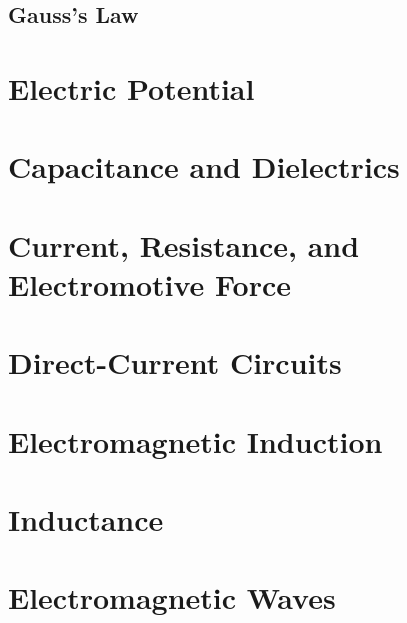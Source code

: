 \documentclass[11pt, letterpaper, titlepage]{report}
\title{\textbf{\Huge{ \begin{center}
Physics 230 Notes\\ %
\end{center} }}}
\author{ Lora Ma and Benjamin Kong\\}
\begin{document}
\maketitle

\maketitle %
{
  \hypersetup{}
  \parskip 0pt
  \tableofcontents
} %
\newpage
{}
\pagestyle{mypagestyle}



\section{Gauss's Law}



\chapter{Electric Potential}
\chapter{Capacitance and Dielectrics}
\chapter{Current, Resistance, and Electromotive Force}
\chapter{Direct-Current Circuits}







\chapter{Electromagnetic Induction}
\chapter{Inductance}
\chapter{Electromagnetic Waves}
\end{document}
